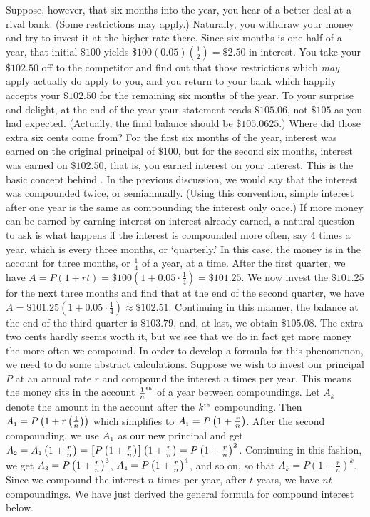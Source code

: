 Suppose, however, that six months into the year, you hear of a better deal at a rival bank. (Some restrictions may apply.) Naturally, you withdraw your money and try to invest it at the higher rate there.  Since six months is one half of a year, that initial $\$100$ yields $\$100(0.05)\left(\frac{1}{2}\right) = \$ 2.50$ in interest.  You take your $\$102.50$ off to the competitor and find out that those restrictions which \textit{may} apply actually \underline{do} apply to you, and you return to your bank which happily accepts your $\$102.50$ for the remaining six months of the year.  To your surprise and delight, at the end of the year your statement reads $\$105.06$, not $\$105$ as you had expected. (Actually, the final balance should be $\$105.0625$.)  Where did those extra six cents come from?  For the first six months of the year, interest was earned on the original principal of $\$100$, but for the second six months, interest was earned on $\$102.50$, that is, you earned interest on your interest.  This is the basic concept behind .  In the previous discussion, we would say that the interest was compounded twice, or semiannually. (Using this convention, simple interest after one year is the same as compounding the interest only once.)  If more money can be earned by earning interest on interest already earned, a natural question to ask is what happens if the interest is compounded more often, say $4$ times a year, which is every three months, or `quarterly.'  In this case, the money is in the account for three months, or $\frac{1}{4}$ of a year, at a time.  After the first quarter, we have $A = P(1+rt) =  \$100 \left(1 + 0.05 \cdot \frac{1}{4} \right) = \$101.25$.  We now invest the $\$101.25$ for the next three months and find that at the end of the second quarter, we have $A =  \$101.25 \left(1 + 0.05 \cdot \frac{1}{4} \right)\approx \$102.51$.  Continuing in this manner, the balance at the end of the third quarter is $\$103.79$, and, at last, we obtain $\$105.08$.  The extra two cents hardly seems worth it, but we see that we do in fact get more money the more often we compound.  In order to develop a formula for this phenomenon, we need to do some abstract calculations.  Suppose we wish to invest our principal $P$ at an annual rate $r$ and compound the interest $n$ times per year.  This means the money sits in the account $\frac{1}{n}^{\mbox{\tiny th}}$ of a year between compoundings.  Let $A_{k}$ denote the amount in the account after the $k^{\mbox{\tiny th}}$ compounding.  Then $A_{\mbox{\tiny$1$}} = P\left(1 + r\left(\frac{1}{n}\right)\right)$ which simplifies to $A_{\mbox{\tiny$1$}} = P \left(1 + \frac{r}{n}\right)$.  After the second compounding, we use $A_{\mbox{\tiny$1$}}$ as our new principal and get $A_{\mbox{\tiny$2$}} = A_{\mbox{\tiny$1$}} \left(1 + \frac{r}{n}\right) = \left[P \left(1 + \frac{r}{n}\right)\right]\left(1 + \frac{r}{n}\right) = P \left(1 + \frac{r}{n}\right)^2$.  Continuing in this fashion, we get $A_{\mbox{\tiny$3$}} =P \left(1 + \frac{r}{n}\right)^3$, $A_{\mbox{\tiny$4$}} =P \left(1 + \frac{r}{n}\right)^4$, and so on, so that $A_{k} = P \left(1 + \frac{r}{n}\right)^k$.  Since we compound the interest $n$ times per year, after $t$ years, we have $nt$ compoundings. We have just derived the general formula for compound interest below.

